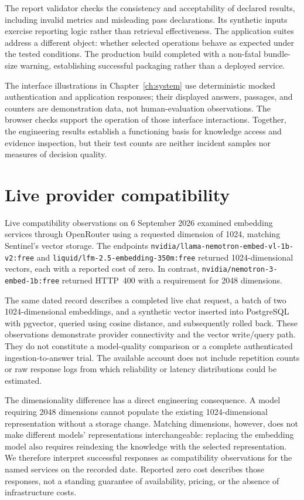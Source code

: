 The report validator checks the consistency and acceptability of declared results, including invalid metrics and misleading pass declarations. Its synthetic inputs exercise reporting logic rather than retrieval effectiveness. The application suites address a different object: whether selected operations behave as expected under the tested conditions. The production build completed with a non-fatal bundle-size warning, establishing successful packaging rather than a deployed service.

The interface illustrations in Chapter~\ref{ch:system} use deterministic mocked authentication and application responses; their displayed answers, passages, and counters are demonstration data, not human-evaluation observations. The browser checks support the operation of those interface interactions. Together, the engineering results establish a functioning basis for knowledge access and evidence inspection, but their test counts are neither incident samples nor measures of decision quality.

\section{Live provider compatibility}

Live compatibility observations on 6 September 2026 examined embedding services through OpenRouter using a requested dimension of 1024, matching Sentinel's vector storage. The endpoints \nolinkurl{nvidia/llama-nemotron-embed-vl-1b-v2:free} and \nolinkurl{liquid/lfm-2.5-embedding-350m:free} returned 1024-dimensional vectors, each with a reported cost of zero. In contrast, \nolinkurl{nvidia/nemotron-3-embed-1b:free} returned HTTP~400 with a requirement for 2048 dimensions.

The same dated record describes a completed live chat request, a batch of two 1024-dimensional embeddings, and a synthetic vector inserted into PostgreSQL with pgvector, queried using cosine distance, and subsequently rolled back. These observations demonstrate provider connectivity and the vector write/query path. They do not constitute a model-quality comparison or a complete authenticated ingestion-to-answer trial. The available account does not include repetition counts or raw response logs from which reliability or latency distributions could be estimated.

The dimensionality difference has a direct engineering consequence. A model requiring 2048 dimensions cannot populate the existing 1024-dimensional representation without a storage change. Matching dimensions, however, does not make different models' representations interchangeable: replacing the embedding model also requires reindexing the knowledge with the selected representation. We therefore interpret successful responses as compatibility observations for the named services on the recorded date. Reported zero cost describes those responses, not a standing guarantee of availability, pricing, or the absence of infrastructure costs.

